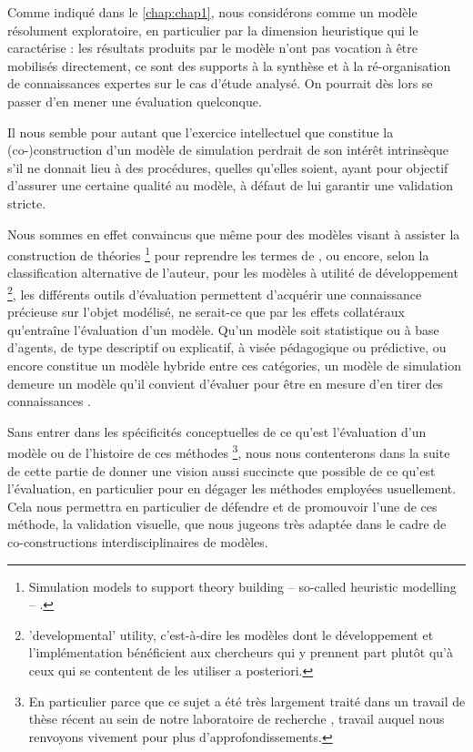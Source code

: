 Comme indiqué dans le \cref{chap:chap1}, nous considérons \simfeodal{} comme un modèle résolument exploratoire, en particulier par la dimension heuristique qui le caractérise : les résultats produits par le modèle n'ont pas vocation à être mobilisés directement, ce sont des supports à la synthèse et à la ré-organisation de connaissances expertes sur le cas d'étude analysé.
On pourrait dès lors se passer d'en mener une évaluation quelconque.

Il nous semble pour autant que l'exercice intellectuel que constitue la (co-)construction d'un modèle de simulation perdrait de son intérêt intrinsèque s'il ne donnait lieu à des procédures, quelles qu'elles soient, ayant pour objectif d'assurer une certaine qualité au modèle, à défaut de lui garantir une validation stricte.

Nous sommes en effet convaincus que même pour des modèles visant à \og assister la construction de théories\fg{}
\footnote{
	\og Simulation models to support theory building -- so-called heuristic modelling -- \textelp{}.\fg{}
} pour reprendre les termes de \textcite[260]{lake_trends_2014}, ou encore, selon la classification alternative de l'auteur, pour les modèles à utilité \og de développement\fg{}
\footnote{
	\og 'developmental' utility\fg{}, c'est-à-dire les modèles dont le développement et l'implémentation bénéficient aux chercheurs qui y prennent part plutôt qu'à ceux qui se contentent de les utiliser a posteriori.
}, les différents outils d'évaluation permettent d'acquérir une connaissance précieuse sur l'objet modélisé, ne serait-ce que par les effets collatéraux qu'entraîne l'évaluation d'un modèle.
Qu'un modèle soit statistique ou à base d'agents, de type descriptif ou explicatif, à visée pédagogique ou prédictive, ou encore constitue un modèle \og hybride\fg{} entre ces catégories, un modèle de simulation demeure un modèle qu'il convient d'évaluer pour être en mesure d'en tirer des connaissances \autocite[299-300]{sargent_history_2017}.

Sans entrer dans les spécificités conceptuelles de ce qu'est l'évaluation d'un modèle ou de l'histoire de ces méthodes
\footnote{
	En particulier parce que ce sujet a été très largement traité dans un travail de thèse récent au sein de notre laboratoire de recherche \autocite[pp. 58--184]{rey-coyrehourcq_plateforme_2015}, travail auquel nous renvoyons vivement pour plus d'approfondissements.
}, nous nous contenterons dans la suite de cette partie de donner une vision aussi succincte que possible de ce qu'est l'évaluation, en particulier pour en dégager les méthodes employées usuellement.
Cela nous permettra en particulier de défendre et de promouvoir l'une de ces méthode, la validation visuelle, que nous jugeons très adaptée dans le cadre de co-constructions interdisciplinaires de modèles.

